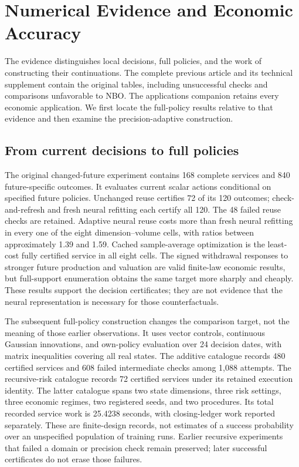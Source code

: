 \section{Numerical Evidence and Economic Accuracy}\label{sec:r37evidence}
The evidence distinguishes local decisions, full policies, and the work of
constructing their continuations. The complete previous article and its
technical supplement contain the original tables, including unsuccessful
checks and comparisons unfavorable to NBO. The applications companion
retains every economic application. We first locate the full-policy results
relative to that evidence and then examine the precision-adaptive construction.

\subsection{From current decisions to full policies}
The original changed-future experiment contains 168 complete services and
840 future-specific outcomes. It evaluates current scalar actions conditional
on specified future policies. Unchanged reuse certifies 72 of its 120 outcomes;
check-and-refresh and fresh neural refitting each certify all 120. The 48
failed reuse checks are retained. Adaptive neural reuse costs more than fresh
neural refitting in every one of the eight dimension--volume cells, with
ratios between approximately 1.39 and 1.59. Cached sample-average optimization
is the least-cost fully certified service in all eight cells. The signed
withdrawal responses to stronger future production and valuation are valid
finite-law economic results, but full-support enumeration obtains the same
target more sharply and cheaply. These results support the decision
certificates; they are not evidence that the neural representation is
necessary for those counterfactuals.

The subsequent full-policy construction changes the comparison target, not
the meaning of those earlier observations. It uses vector controls,
continuous Gaussian innovations, and own-policy evaluation over 24 decision
dates, with matrix inequalities covering all real states. The additive
catalogue records 480 certified services and 608 failed intermediate checks
among 1,088 attempts. The recursive-risk catalogue records 72 certified
services under its retained execution identity. The latter catalogue spans
two state dimensions, three risk settings, three economic regimes, two
registered seeds, and two procedures. Its total recorded service work is
25.4238 seconds, with closing-ledger work reported separately. These are
finite-design records, not estimates of a success probability over an
unspecified population of training runs. Earlier recursive experiments
that failed a domain or precision check remain preserved; later successful
certificates do not erase those failures.

